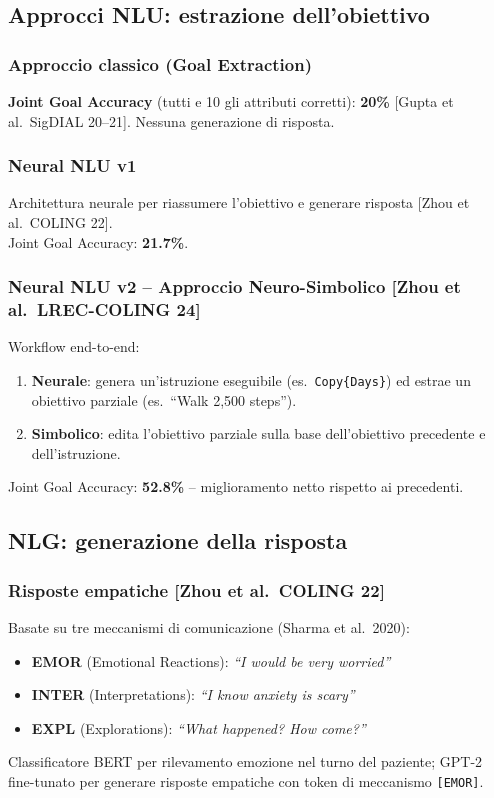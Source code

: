 \documentclass[a4paper,12pt]{article}
\begin{document}
\subsection{Approcci NLU: estrazione dell'obiettivo}

\subsubsection{Approccio classico (Goal Extraction)}
\textbf{Joint Goal Accuracy} (tutti e 10 gli attributi corretti): \textbf{20\%} [Gupta et al.\ SigDIAL 20--21]. Nessuna generazione di risposta.

\subsubsection{Neural NLU v1}
Architettura neurale per riassumere l'obiettivo e generare risposta [Zhou et al.\ COLING 22].\\
Joint Goal Accuracy: \textbf{21.7\%}.

\subsubsection{Neural NLU v2 -- Approccio Neuro-Simbolico [Zhou et al.\ LREC-COLING 24]}
Workflow end-to-end:
\begin{enumerate}
    \item \textbf{Neurale}: genera un'istruzione eseguibile (es.\ \texttt{Copy\{Days\}}) ed estrae un obiettivo parziale (es.\ ``Walk 2,500 steps'').
    \item \textbf{Simbolico}: edita l'obiettivo parziale sulla base dell'obiettivo precedente e dell'istruzione.
\end{enumerate}
Joint Goal Accuracy: \textbf{52.8\%} -- miglioramento netto rispetto ai precedenti.

\subsection{NLG: generazione della risposta}

\subsubsection{Risposte empatiche [Zhou et al.\ COLING 22]}
Basate su tre meccanismi di comunicazione (Sharma et al.\ 2020):
\begin{itemize}
    \item \textbf{EMOR} (Emotional Reactions): \textit{``I would be very worried''}
    \item \textbf{INTER} (Interpretations): \textit{``I know anxiety is scary''}
    \item \textbf{EXPL} (Explorations): \textit{``What happened? How come?''}
\end{itemize}
Classificatore BERT per rilevamento emozione nel turno del paziente; GPT-2 fine-tunato per generare risposte empatiche con token di meccanismo \texttt{[EMOR]}.
\end{document}
